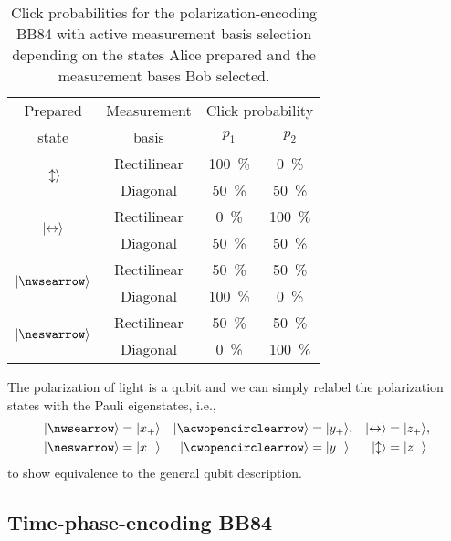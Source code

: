 \begin{table}[htb]
	\centering
	\begin{tabular}{cccc}
		\toprule
		Prepared & Measurement & \multicolumn{2}{c}{Click probability} \\
		state & basis & $p_1$ & $p_2$ \\
		\midrule
		\multirow{2}{*}{$\lvert\updownarrow\rangle$} & Rectilinear & \SI{100}{\percent} & \SI{0}{\percent} \\
		& Diagonal & \SI{50}{\percent} & \SI{50}{\percent} \\
		\cmidrule{1-1}
		\multirow{2}{*}{$\lvert\leftrightarrow\rangle$} & Rectilinear & \SI{0}{\percent} & \SI{100}{\percent} \\
		& Diagonal & \SI{50}{\percent} & \SI{50}{\percent} \\
		\cmidrule{1-1}
		\multirow{2}{*}{$\ket{\nwsearrow}$} & Rectilinear & \SI{50}{\percent} & \SI{50}{\percent} \\
		& Diagonal & \SI{100}{\percent} & \SI{0}{\percent} \\
		\cmidrule{1-1}
		\multirow{2}{*}{$\ket{\neswarrow}$} & Rectilinear & \SI{50}{\percent} & \SI{50}{\percent} \\
		& Diagonal & \SI{0}{\percent} & \SI{100}{\percent} \\
		\bottomrule
	\end{tabular}
	\caption{Click probabilities for the polarization-encoding BB84 with active measurement basis selection depending on the states Alice prepared and the measurement bases Bob selected.}\label{tab:bb84_polarization_clicks}
\end{table}
The polarization of light is a qubit and we can simply relabel the polarization states with the Pauli eigenstates, i.e.,
\begin{align}
	\ket{\nwsearrow}
	&=
	\ket{x_+}
	&
	\ket{\acwopencirclearrow}
	&=
	\ket{y_+},
	&
	\ket{\leftrightarrow}
	&=
	\ket{z_+},
	\\
	\ket{\neswarrow}
	&=
	\ket{x_-}
	&
	\ket{\cwopencirclearrow}
	&=
	\ket{y_-}
	&
	\ket{\updownarrow}
	&=
	\ket{z_-}
\end{align}
to show equivalence to the general qubit description.

\FloatBarrier
\subsection{Time-phase-encoding BB84}

